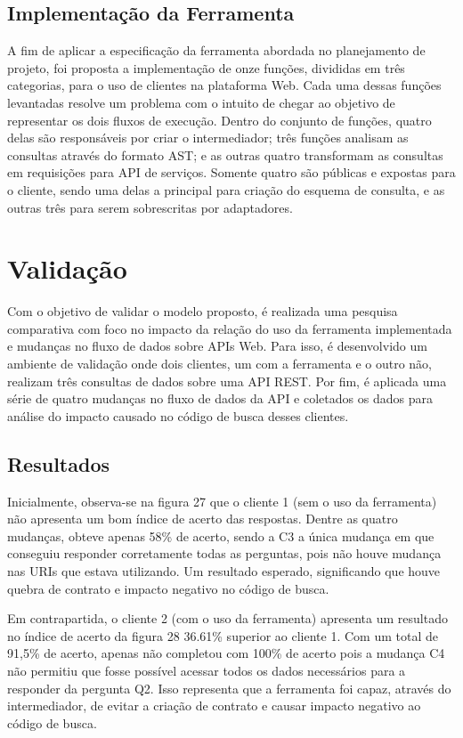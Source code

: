 \documentclass[12pt]{article}
\begin{document}
  \subsection{Implementação da Ferramenta}

  A fim de aplicar a especificação da ferramenta abordada no planejamento de projeto, foi proposta a implementação de onze funções, divididas em três categorias, para o uso de clientes na plataforma Web. Cada uma dessas funções levantadas resolve um problema com o intuito de chegar ao objetivo de representar os dois fluxos de execução. Dentro do conjunto de funções, quatro delas são responsáveis por criar o intermediador; três funções analisam as consultas através do formato AST; e as outras quatro transformam as consultas em requisições para API de serviços. Somente quatro são públicas e expostas para o cliente, sendo uma delas a principal para criação do esquema de consulta, e as outras três para serem sobrescritas por adaptadores.

  \section{Validação}\label{sec:figs}
	
  Com o objetivo de validar o modelo proposto, é realizada uma pesquisa comparativa com foco no impacto da relação do uso da ferramenta implementada e mudanças no fluxo de dados sobre APIs Web. Para isso, é desenvolvido um ambiente de validação onde dois clientes, um com a ferramenta e o outro não, realizam três consultas de dados sobre uma API REST. Por fim, é aplicada uma série de quatro mudanças no fluxo de dados da API e coletados os dados para análise do impacto causado no código de busca desses clientes.
  
  \subsection{Resultados}
  
  Inicialmente, observa-se na figura 27 que o cliente 1 (sem o uso da ferramenta) não apresenta um bom índice de acerto das respostas. Dentre as quatro mudanças, obteve apenas 58\% de acerto, sendo a C3 a única mudança em que conseguiu responder corretamente todas as perguntas, pois não houve mudança nas URIs que estava utilizando. Um resultado esperado, significando que houve quebra de contrato e impacto negativo no código de busca.

  Em contrapartida, o cliente 2 (com o uso da ferramenta) apresenta um resultado no índice de acerto da figura 28 36.61\% superior ao cliente 1. Com um total de 91,5\% de acerto, apenas não completou com 100\% de acerto pois a mudança C4 não permitiu que fosse possível acessar todos os dados necessários para a responder da pergunta Q2. Isso representa que a ferramenta foi capaz, através do intermediador, de evitar a criação de contrato e causar impacto negativo ao código de busca.
\end{document}
